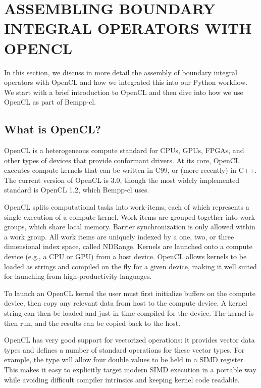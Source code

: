 \section{ASSEMBLING BOUNDARY INTEGRAL OPERATORS WITH OPENCL}

In this section, we discuss in more detail the assembly of boundary integral operators with OpenCL
and how we integrated this into our Python workflow. We start with a brief introduction to OpenCL and then
dive into how we use OpenCL as part of Bempp-cl.

\subsection{What is OpenCL?}

OpenCL \cite{opencl} is a heterogeneous compute standard for CPUs, GPUs, FPGAs, and other types of devices that provide conformant drivers. At its core, OpenCL executes compute kernels that can be written in C99, or (more recently) in C++. The current version of OpenCL is 3.0, though the most widely implemented standard is OpenCL 1.2, which Bempp-cl uses.

OpenCL splits computational tasks into work-items, each of which represents a single execution of a compute kernel. Work items are grouped together into work groups, which share local memory. Barrier synchronization is only allowed within a work group. All work items are uniquely indexed by a one, two, or three dimensional index space, called NDRange. Kernels are launched onto a compute device (e.g., a CPU or GPU) from a host device. OpenCL allows kernels to be loaded as strings and compiled on the fly for a given device, making it well suited for launching from high-productivity languages.

To launch an OpenCL kernel the user must first initialize buffers on the compute device, then copy any relevant data from host to the compute device. A kernel string can then be loaded and just-in-time compiled for the device. The kernel is then run, and the results can be copied back to the host.

OpenCL has very good support for vectorized operations: it provides vector data types and defines a number of standard operations for these vector types. For example, the type  will allow four double values to be held in a SIMD register. This makes it easy to explicitly target modern SIMD execution in a portable way while avoiding difficult compiler intrinsics and keeping kernel code readable.

